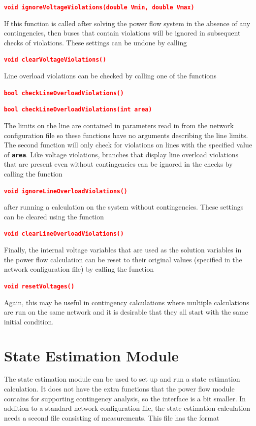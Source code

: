 \documentclass[12pt]{report} %
\begin{document}
\textcolor{red}{\texttt{\textbf{void ignoreVoltageViolations(double Vmin, double Vmax)}}}

If this function is called after solving the power flow system in the absence of any contingencies, then buses that contain violations will be ignored in subsequent checks of violations. These settings can be undone by calling

\textcolor{red}{\texttt{\textbf{void clearVoltageViolations()}}}

Line overload violations can be checked by calling one of the functions

\textcolor{red}{\texttt{\textbf{bool checkLineOverloadViolations()}}}

\textcolor{red}{\texttt{\textbf{bool checkLineOverloadViolations(int area)}}}

The limits on the line are contained in parameters read in from the network configuration file so these functions have no arguments describing the line limits. The second function will only check for violations on lines with the specified value of \texttt{\textbf{area}}. Like voltage violations, branches that display line overload violations that are present even without contingencies can be ignored in the checks by calling the function

\textcolor{red}{\texttt{\textbf{void ignoreLineOverloadViolations()}}}

after running a calculation on the system without contingencies. These settings can be cleared using the function

\textcolor{red}{\texttt{\textbf{void clearLineOverloadViolations()}}}

Finally, the internal voltage variables that are used as the solution variables in the power flow calculation can be reset to their original values (specified in the network configuration file) by calling the function

\textcolor{red}{\texttt{\textbf{void resetVoltages()}}}

Again, this may be useful in contingency calculations where multiple calculations are run on the same network and it is desirable that they all start with the same initial condition.

\section{State Estimation Module}

The state estimation module can be used to set up and run a state estimation calculation. It does not have the extra functions that the power flow module contains for supporting contingency analysis, so the interface is a bit smaller. In addition to a standard network configuration file, the state estimation calculation needs a second file consisting of measurements. This file has the format
\end{document}
